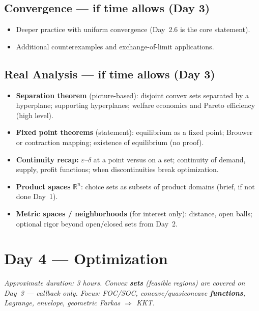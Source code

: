 \documentclass[11pt,a4paper]{article}
\begin{document}
\subsection{Convergence --- \textbf{if time allows (Day 3)}}
\begin{itemize}[leftmargin=*]
    \item Deeper practice with uniform convergence (Day~2.6 is the core statement).
    \item Additional counterexamples and exchange-of-limit applications.
\end{itemize}

\subsection{Real Analysis --- \textbf{if time allows (Day 3)}}
\begin{itemize}[leftmargin=*]
    \item \textbf{Separation theorem} (picture-based): disjoint convex sets separated by a hyperplane;
      supporting hyperplanes; welfare economics and Pareto efficiency (high level).
    \item \textbf{Fixed point theorems} (statement): equilibrium as a fixed point;
      Brouwer or contraction mapping; existence of equilibrium (no proof).
    \item \textbf{Continuity recap:} $\varepsilon$--$\delta$ at a point versus on a set;
      continuity of demand, supply, profit functions; when discontinuities break optimization.
    \item \textbf{Product spaces} $\mathbb{R}^n$: choice sets as subsets of product domains (brief, if not done Day~1).
    \item \textbf{Metric spaces / neighborhoods} (for interest only): distance, open balls; optional rigor beyond open/closed sets from Day~2.
\end{itemize}

\section{Day 4 --- Optimization}

\textit{Approximate duration: 3 hours.
Convex \textbf{sets} (feasible regions) are covered on Day~3 --- callback only.
Focus: FOC/SOC, concave/quasiconcave \textbf{functions}, Lagrange, envelope, geometric Farkas $\Rightarrow$ KKT.}
\end{document}
